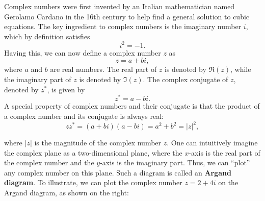 \documentclass{article}
\begin{document}
    \begin{tcolorbox}[arc=2mm, colback=magenta!15!white, colframe=magenta!80!black, title=\textsc{An Introduction to Complex Numbers (Enrichment)}]
        Complex numbers were first invented by an Italian mathematician named Gerolamo Cardano in the 16th century to help find a general solution to cubic equations. The key ingredient to complex numbers is the imaginary number $i$, which by definition satisfies
        \[
        i^2 = -1.
        \]
        Having this, we can now define a complex number $z$ as
        \[
        z = a + bi,
        \]
        where $a$ and $b$ are real numbers. The real part of $z$ is denoted by $\Re(z)$, while the imaginary part of $z$ is denoted by $\Im(z)$. The complex conjugate of $z$, denoted by $z^*$, is given by
        \[
        z^* = a - bi.
        \]
        A special property of complex numbers and their conjugate is that the product of a complex number and its conjugate is always real:
        \[
        z z^* = (a + bi)(a - bi) = a^2 + b^2 = |z|^2,
        \]
        \begin{minipage}{0.5\linewidth}
            
        where $|z|$ is the magnitude of the complex number $z$. One can intuitively imagine the complex plane as a two-dimensional plane, where the $x$-axis is the real part of the complex number and the $y$-axis is the imaginary part. Thus, we can ``plot'' any complex number on this plane. Such a diagram is called an \textbf{Argand diagram}. To illustrate, we can plot the complex number $z = 2 + 4i$ on the Argand diagram, as shown on the right:
        \end{minipage}
        \begin{minipage}{0.5\linewidth}
            \begin{center}
        \end{center}

        \end{minipage}



\end{tcolorbox}
\end{document}
